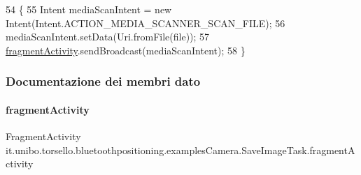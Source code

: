 \begin{DoxyCode}
54                                            \{
55         Intent mediaScanIntent = \textcolor{keyword}{new} Intent(Intent.ACTION\_MEDIA\_SCANNER\_SCAN\_FILE);
56         mediaScanIntent.setData(Uri.fromFile(file));
57         \hyperlink{classit_1_1unibo_1_1torsello_1_1bluetoothpositioning_1_1examplesCamera_1_1SaveImageTask_a020c67ae36b7f908c900da193d9cd110_a020c67ae36b7f908c900da193d9cd110}{fragmentActivity}.sendBroadcast(mediaScanIntent);
58     \}
\end{DoxyCode}


\subsubsection{Documentazione dei membri dato}
\hypertarget{classit_1_1unibo_1_1torsello_1_1bluetoothpositioning_1_1examplesCamera_1_1SaveImageTask_a020c67ae36b7f908c900da193d9cd110_a020c67ae36b7f908c900da193d9cd110}{}\label{classit_1_1unibo_1_1torsello_1_1bluetoothpositioning_1_1examplesCamera_1_1SaveImageTask_a020c67ae36b7f908c900da193d9cd110_a020c67ae36b7f908c900da193d9cd110} 
\paragraph{\texorpdfstring{fragment\+Activity}{fragmentActivity}}
{\footnotesize\ttfamily Fragment\+Activity it.\+unibo.\+torsello.\+bluetoothpositioning.\+examples\+Camera.\+Save\+Image\+Task.\+fragment\+Activity\hspace{0.3cm}{\ttfamily [package]}}

\hypertarget{classit_1_1unibo_1_1torsello_1_1bluetoothpositioning_1_1examplesCamera_1_1SaveImageTask_a908ad84901185def0257ea5288f64c3c_a908ad84901185def0257ea5288f64c3c}{}\label{classit_1_1unibo_1_1torsello_1_1bluetoothpositioning_1_1examplesCamera_1_1SaveImageTask_a908ad84901185def0257ea5288f64c3c_a908ad84901185def0257ea5288f64c3c} 
